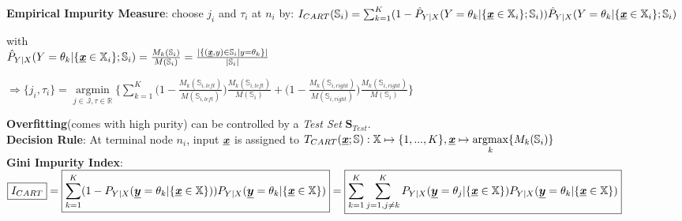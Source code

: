 \begin{sectionbox}
	
	\textbf{Empirical Impurity Measure}: choose $j_i$ and $\tau_i$ at $n_i$ by:
	$I_{CART}(\mathbb{S}_i)=\sum_{k=1}^{K}(1-\hat{P}_{Y|X}(Y=\theta_k|\{\underline{\textbf{\textit{x}}}\in\mathbb{X}_i\};\mathbb{S}_i))\hat{P}_{Y|X}(Y=\theta_k|\{\underline{\textbf{\textit{x}}}\in\mathbb{X}_i\};\mathbb{S}_i)$
	
	with\\ $\hat{P}_{Y|X}(Y=\theta_k|\{\underline{\textbf{\textit{x}}}\in\mathbb{X}_i\};\mathbb{S}_i)=\frac{M_k(\mathbb{S}_i)}{M(\mathbb{S}_i)}=\frac{|\{(\underline{\textbf{\textit{x}}},y)\in\mathbb{S}_i|y=\theta_k\}|}{|\mathbb{S}_i|}$
	
	$\Rightarrow \{j_i,\tau_i\}=\underset{j\in\mathbb{J},\tau\in\mathbb{R}}{\operatorname{argmin}}\Big\{\sum_{k=1}^{K}\Big(1-\frac{M_k(\mathbb{S}_{i,left})}{M(\mathbb{S}_{i,left})}\Big)\frac{M_k(\mathbb{S}_{i,left})}{M(\mathbb{S}_{i})}+\Big(1-\frac{M_k(\mathbb{S}_{i,right})}{M(\mathbb{S}_{i,right})}\Big)\frac{M_k(\mathbb{S}_{i,right})}{M(\mathbb{S}_{i})}\Big\}$
	
	\textbf{Overfitting}(comes with high purity) can be controlled by a \textit{Test Set} $\mathbf{S}_{Test}$.\\
	\textbf{Decision Rule}: At terminal node $n_i$, input $\underline{\textbf{\textit{x}}}$ is assigned to $T_{CART}(\underline{\textbf{\textit{x}}};\mathbb{S}):\mathbb{X}\mapsto \{1,...,K\}, \underline{\textbf{\textit{x}}}\mapsto \underset{k}{\operatorname{argmax}}\{M_k(\mathbb{S}_i)\}$\\
	
	\textbf{Gini Impurity Index}: $\boxed{I_{CART}}=\\\boxed{\sum_{k=1}^{K}(1-P_{Y|X}(\underline{\boldsymbol{y}}=\theta_k|\{\underline{\textbf{\textit{x}}}\in\mathbb{X}\}))P_{Y|X}(\underline{\boldsymbol{y}}=\theta_k|\{\underline{\textbf{\textit{x}}}\in\mathbb{X}\})}
	=\boxed{\sum_{k=1}^{K}\sum_{j=1,j\neq k}^{K}P_{Y|X}(\underline{\boldsymbol{y}}=\theta_j|\{\underline{\textbf{\textit{x}}}\in\mathbb{X}\})P_{Y|X}(\underline{\boldsymbol{y}}=\theta_k|\{\underline{\textbf{\textit{x}}}\in\mathbb{X}\})}$
	
	
\end{sectionbox}

